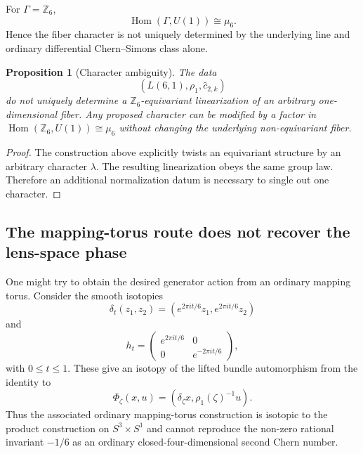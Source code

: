 \documentclass[11pt,a4paper]{article}
\newtheorem{proposition}[definition]{Proposition}
\begin{document}
For $\Gamma=\mathbb Z_6$,
\begin{equation}
\operatorname{Hom}(\Gamma,U(1))\cong\mu_6.
\end{equation}
Hence the fiber character is not uniquely determined by the underlying line and ordinary differential Chern--Simons class alone.

\begin{proposition}[Character ambiguity]
The data
\begin{equation}
\left(L(6,1),\rho_1,\widehat c_{2,k}\right)
\end{equation}
do not uniquely determine a $\mathbb Z_6$-equivariant linearization of an arbitrary one-dimensional fiber. Any proposed character can be modified by a factor in $\operatorname{Hom}(\mathbb Z_6,U(1))\cong\mu_6$ without changing the underlying non-equivariant fiber.
\end{proposition}

\begin{proof}
The construction above explicitly twists an equivariant structure by an arbitrary character $\lambda$. The resulting linearization obeys the same group law. Therefore an additional normalization datum is necessary to single out one character.
\end{proof}

\subsection{The mapping-torus route does not recover the lens-space phase}

One might try to obtain the desired generator action from an ordinary mapping torus. Consider the smooth isotopies
\begin{equation}
\delta_t(z_1,z_2)
=\left(e^{2\pi i t/6}z_1,e^{2\pi i t/6}z_2\right)
\end{equation}
and
\begin{equation}
h_t=
\begin{pmatrix}
 e^{2\pi i t/6}&0\\
 0&e^{-2\pi i t/6}
\end{pmatrix},
\end{equation}
with $0\le t\le1$. These give an isotopy of the lifted bundle automorphism from the identity to
\begin{equation}
\Phi_\zeta(x,u)
=
\left(\delta_\zeta x,\rho_1(\zeta)^{-1}u\right).
\end{equation}
Thus the associated ordinary mapping-torus construction is isotopic to the product construction on $S^3\times S^1$ and cannot reproduce the non-zero rational invariant $-1/6$ as an ordinary closed-four-dimensional second Chern number.
\end{document}
